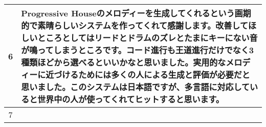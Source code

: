 \begin{table}[htbp]
\begin{center}
\begin{tabular}{cp{30em}}
      6 & Progressive Houseのメロディーを生成してくれるという画期的で素晴らしいシステムを作ってくれて感謝します。改善してほしいところとしてはリードとドラムのズレとたまにキーにない音が鳴ってしまうところです。コード進行も王道進行だけでなく3種類ほどから選べるといいかなと思いました。実用的なメロディーに近づけるためには多くの人による生成と評価が必要だと思いました。このシステムは日本語ですが、多言語に対応していると世界中の人が使ってくれてヒットすると思います。 \\ \hline
      7 &  \\ \hline
    \end{tabular}
  \end{center}
\end{table}